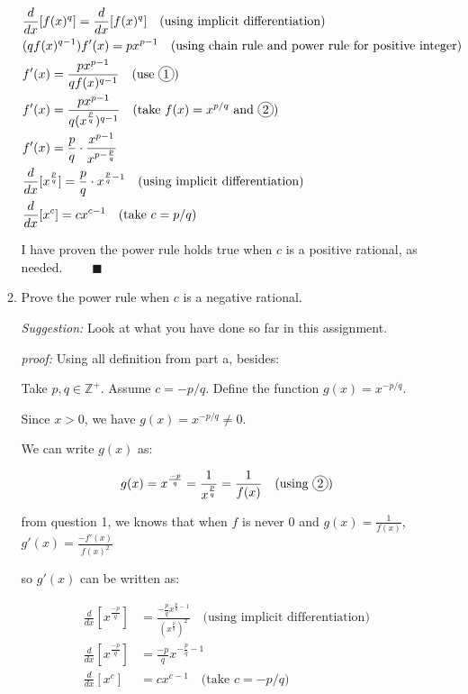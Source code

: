 \documentclass[12pt]{exam}
\newcommand*\circled[1]{\tikz[baseline=(char.base)]{
    \node[shape=circle, draw, inner sep=1pt, 
        minimum height=12pt] (char) {#1};}}
\newcommand {\DS} [1] {${\displaystyle #1}$}
\newcommand{\vv}{\vspace{.4cm}}
\newcommand{\Z}{\mathbb{Z}}
\begin{document}
\begin{enumerate}[resume]
\begin{enumerate}
		\begin{align*}
			& \frac{d}{dx}[f(x)^q] = \frac{d}{dx}[f(x)^q] \quad \mbox{(using implicit differentiation)} \\
			& (qf(x)^{q-1} )f'(x) = px^{p-1}  \quad \mbox{(using chain rule and power rule for positive integer)} \\
			& f'(x) = \frac{px^{p-1}}{qf(x)^{q-1}} \quad \mbox{(use } \circled{1} \mbox{)} \\
			& f'(x) = \frac{px^{p-1}}{q(x^{\frac{p}{q}})^{q-1}} \quad \mbox{(take } f(x)=x^{p/q} \mbox{ and \circled{2})} \\
			& f'(x) = \frac{p}{q} \cdot \frac{x^{p - 1}}{x^{p - \frac{p}{q}}} \\
			& \frac{d}{dx}[x^\frac{p}{q}] = \frac{p}{q} \cdot x^{\frac{p}{q} - 1} \quad \mbox{(using implicit differentiation)} \\
			& \frac{d}{dx}[x^c] = c x^{c-1} \quad \mbox{(take $c=p/q$)}
		\end{align*}

		I have proven the power rule holds true when $c$ is a positive rational, as needed. $\quad \quad \blacksquare$

		\newpage

		\item  Prove the power rule when $c$ is a negative rational.

		\emph{Suggestion:} Look at what you have done so far in this assignment.

		\vv

		\emph{proof:}
		Using all definition from part a, besides:

		Take $p, q \in \Z^+$. Assume $c=-p/q$. Define the function $g(x)=x^{-p/q}$.

		Since $x > 0$, we have $g(x)=x^{-p/q} \neq 0$.

		We can write $g(x)$ as:

		$$
			g(x) = x^{\frac{-p}{q}} = \frac{1}{x^\frac{p}{q}} = \frac{1}{f(x)} \quad \mbox{(using $\circled{2}$)}
		$$

		from question 1, we knows that when $f$ is never $0$ and \DS{g(x) = \frac{1}{f(x)}}, \DS{g'(x) =  \frac{-f'(x)}{f(x)^2}}

		so $g'(x)$ can be written as:

		\begin{align*}
			\frac{d}{dx}[x^\frac{-p}{q}] &= \frac{-\frac{p}{q}x^{\frac{p}{q} - 1}}{(x^{\frac{p}{q}})^2} \quad \mbox{(using implicit differentiation)}\\
			\frac{d}{dx}[x^\frac{-p}{q}] &= \frac{-p}{q}x^{-\frac{p}{q} - 1}\\
			\frac{d}{dx}[x^c] &= c x^{c-1} \quad \mbox{(take $c=-p/q$)}\\
		\end{align*}


\end{enumerate}
\end{enumerate}
\end{document}
